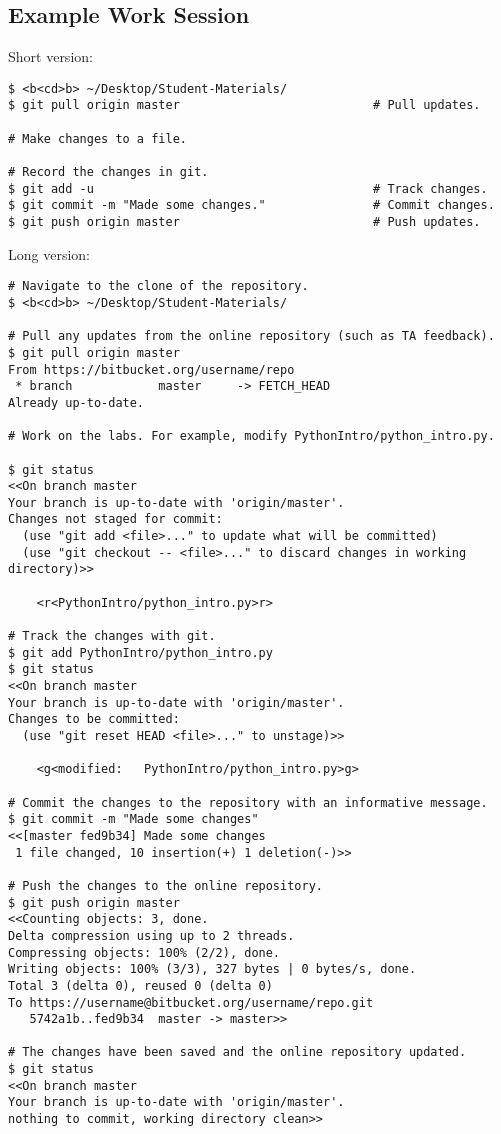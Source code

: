 
\subsection*{Example Work Session}

Short version:
\begin{lstlisting}
$ <b<cd>b> ~/Desktop/Student-Materials/
$ git pull origin master                           # Pull updates.

# Make changes to a file.

# Record the changes in git.
$ git add -u                                       # Track changes.
$ git commit -m "Made some changes."               # Commit changes.
$ git push origin master                           # Push updates.
\end{lstlisting}

Long version:
\begin{lstlisting}
# Navigate to the clone of the repository.
$ <b<cd>b> ~/Desktop/Student-Materials/

# Pull any updates from the online repository (such as TA feedback).
$ git pull origin master
From https://bitbucket.org/username/repo
 * branch            master     -> FETCH_HEAD
Already up-to-date.

# Work on the labs. For example, modify PythonIntro/python_intro.py.

$ git status
<<On branch master
Your branch is up-to-date with 'origin/master'.
Changes not staged for commit:
  (use "git add <file>..." to update what will be committed)
  (use "git checkout -- <file>..." to discard changes in working directory)>>

    <r<PythonIntro/python_intro.py>r>

# Track the changes with git.
$ git add PythonIntro/python_intro.py
$ git status
<<On branch master
Your branch is up-to-date with 'origin/master'.
Changes to be committed:
  (use "git reset HEAD <file>..." to unstage)>>

    <g<modified:   PythonIntro/python_intro.py>g>

# Commit the changes to the repository with an informative message.
$ git commit -m "Made some changes"
<<[master fed9b34] Made some changes
 1 file changed, 10 insertion(+) 1 deletion(-)>>

# Push the changes to the online repository.
$ git push origin master
<<Counting objects: 3, done.
Delta compression using up to 2 threads.
Compressing objects: 100% (2/2), done.
Writing objects: 100% (3/3), 327 bytes | 0 bytes/s, done.
Total 3 (delta 0), reused 0 (delta 0)
To https://username@bitbucket.org/username/repo.git
   5742a1b..fed9b34  master -> master>>

# The changes have been saved and the online repository updated.
$ git status
<<On branch master
Your branch is up-to-date with 'origin/master'.
nothing to commit, working directory clean>>
\end{lstlisting}
